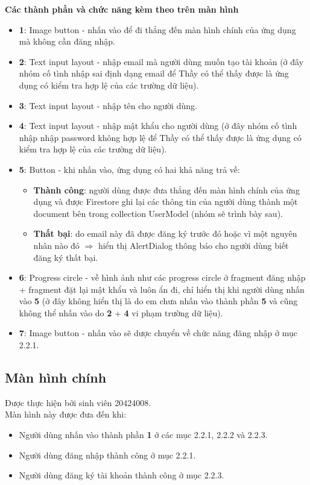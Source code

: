 \documentclass[12pt]{article}
\begin{document}
\indent \textbf{Các thành phần và chức năng kèm theo trên màn hình}
\begin{itemize}
    \item \textbf{1}: Image button - nhấn vào để đi thẳng đến màn hình chính của ứng dụng mà không cần đăng nhập.
    \item \textbf{2}: Text input layout - nhập email mà người dùng muốn tạo tài khoản (ở đây nhóm cố tình nhập sai định dạng email để Thầy có thể thấy được là ứng dụng có kiểm tra hợp lệ của các trường dữ liệu).
    \item \textbf{3}: Text input layout - nhập tên cho người dùng.
    \item \textbf{4}: Text input layout - nhập mật khẩu cho người dùng (ở đây nhóm cố tình nhập nhập password không hợp lệ để Thầy có thể thấy được là ứng dụng có kiểm tra hợp lệ của các trường dữ liệu).
    \item \textbf{5}: Button - khi nhấn vào, ứng dụng có hai khả năng trả về:
    \begin{itemize}
        \item \textbf{Thành công}: người dùng được đưa thẳng đến màn hình chính của ứng dụng và được Firestore ghi lại các thông tin của người dùng thành một document bên trong collection \textsf{UserModel} (nhóm sẽ trình bày sau).
        \item \textbf{Thất bại}: do email này đã được đăng ký trước đó hoặc vì một nguyên nhân nào đó $\Rightarrow$ hiển thị AlertDialog thông báo cho người dùng biết đăng ký thất bại.
    \end{itemize}

    \newpage
    \item \textbf{6}: Progress circle - về hình ảnh như các progress circle ở fragment đăng nhập + fragment đặt lại mật khẩu và luôn ẩn đi, chỉ hiển thị khi người dùng nhấn vào \textbf{5} (ở đây không hiển thị là do em chưa nhấn vào thành phần \textbf{5} và cũng không thể nhấn vào do \textbf{2} + \textbf{4} vi phạm trường dữ liệu).
    \item \textbf{7}: Image button - nhấn vào sẽ dược chuyển về chức năng đăng nhập ở mục 2.2.1.
\end{itemize}

\subsection{Màn hình chính}
Được thực hiện bởi sinh viên 20424008.\\

\indent Màn hình này được đưa đến khi:
\begin{itemize}
    \item Người dùng nhấn vào thành phần \textbf{1} ở các mục 2.2.1, 2.2.2 và 2.2.3.
    \item Người dùng đăng nhập thành công ở mục 2.2.1.
    \item Người dùng đăng ký tài khoản thành công ở mục 2.2.3.
\end{itemize}
\end{document}
